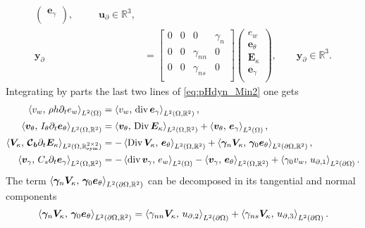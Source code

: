 \begin{subequations}
\begin{align}
\begin{pmatrix}
	\bm{e}_{\gamma} \\
	\end{pmatrix}, \qquad\;\; \bm{u}_\partial \in \mathbb{R}^3, \\
	\bm{y}_\partial &= 
	\begin{bmatrix}
	{0} &  {0} & {0} & \gamma_{n} \\
	{0} &  {0} & \gamma_{nn} & {0} \\
	{0} &  {0} & \gamma_{ns} & {0} \\
	\end{bmatrix}
	\begin{pmatrix}
	e_w \\
	\bm{e}_{\theta} \\
	\bm{E}_{\kappa} \\
	\bm{e}_{\gamma} \\
	\end{pmatrix}, \qquad \bm{y}_\partial \in \mathbb{R}^3.
	\end{align}
\end{subequations}
Integrating by parts the last two lines of \eqref{eq:pHdyn_Min2} one gets 
\begin{equation}\label{eq:weak_min_div}
\begin{aligned}
\inner[L^2(\Omega)]{v_w}{\rho h \partial_t e_w} &= \inner[L^2(\Omega, \mathbb{R}^{2})]{v_w}{\div \bm{e}_\gamma}, \\
\inner[L^2(\Omega, \mathbb{R}^{2})]{\bm{v}_\theta}{I_\theta \partial_t \bm{e}_\theta} &= \inner[L^2(\Omega, \mathbb{R}^{2})]{\bm{v}_\theta}{\Div \bm{E}_\kappa} + \inner[L^2(\Omega)]{\bm{v}_\theta}{\bm{e}_\gamma} , \\
\inner[L^2(\Omega, \mathbb{R}^{2\times 2}_{\text{sym}})]{\bm{V}_\kappa}{\bm{\mathcal{C}_b} \partial_t \bm{E}_\kappa} &= -\inner[L^2(\Omega, \mathbb{R}^{2})]{\Div \bm{V}_\kappa}{\bm{e}_\theta} + \inner[L^2(\partial\Omega, \mathbb{R}^2)]{\bm\gamma_n \bm{V}_\kappa}{\bm\gamma_0 \bm{e}_{\theta}}, \\
\inner[L^2(\Omega, \mathbb{R}^{2})]{\bm{v}_\gamma}{C_s \partial_t \bm{e}_\gamma} &= -\inner[L^2(\Omega)]{\div \bm{v}_\gamma}{e_w} - \inner[L^2(\Omega, \mathbb{R}^{2})]{\bm{v}_\gamma}{\bm{e}_\theta}  + \inner[L^2(\partial\Omega)]{\gamma_0 v_w}{{u}_{\partial, 1}}. \\
\end{aligned}
\end{equation}
The term $\inner[L^2(\partial\Omega, \mathbb{R}^2)]{\bm\gamma_n \bm{V}_\kappa}{\bm\gamma_0 \bm{e}_{\theta}}$ can be decomposed in its tangential and normal components
\begin{equation}
\inner[L^2(\partial\Omega, \mathbb{R}^2)]{\bm\gamma_n \bm{V}_\kappa}{\bm\gamma_0 \bm{e}_{\theta}} = \inner[L^2(\partial\Omega)]{\gamma_{nn} \bm{V}_\kappa}{{u}_{\partial,2}} + \inner[L^2(\partial\Omega)]{\gamma_{ns} \bm{V}_\kappa}{{u}_{\partial,3}}.
\end{equation}
